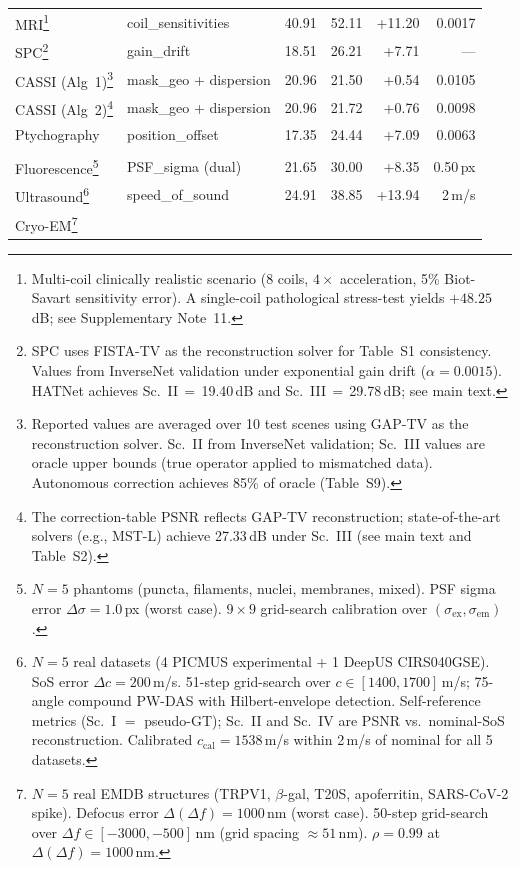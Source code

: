 \documentclass[11pt]{article}
\theoremstyle{definition}
\begin{document}
\begin{longtable}{>{\raggedright}p{2.0cm} >{\raggedright}p{2.8cm}
                  r r r r}
MRI\footnote{Multi-coil clinically realistic scenario (8 coils, $4\times$ acceleration, 5\% Biot-Savart sensitivity error). A single-coil pathological stress-test yields $+48.25$\,dB; see Supplementary Note~11.}
  & coil\_sensitivities
  & 40.91 & 52.11 & +11.20
  & 0.0017 \\
SPC\footnote{SPC uses FISTA-TV as the reconstruction solver for Table~S1 consistency.  Values from InverseNet validation under exponential gain drift ($\alpha{=}0.0015$).  HATNet achieves Sc.~II$\,=\,$19.40\,dB and Sc.~III$\,=\,$29.78\,dB; see main text.}
  & gain\_drift
  & 18.51 & 26.21 & +7.71
  & --- \\
CASSI (Alg~1)\footnote{Reported values are averaged over 10 test scenes using GAP-TV as the reconstruction solver. Sc.~II from InverseNet validation; Sc.~III values are oracle upper bounds (true operator applied to mismatched data). Autonomous correction achieves 85\% of oracle (Table~S9).}
  & mask\_geo + dispersion
  & 20.96 & 21.50 & +0.54
  & 0.0105 \\
CASSI (Alg~2)\footnote{The correction-table PSNR reflects GAP-TV reconstruction; state-of-the-art solvers (e.g., MST-L) achieve 27.33\,dB under Sc.~III (see main text and Table~S2).}
  & mask\_geo + dispersion
  & 20.96 & 21.72 & +0.76
  & 0.0098 \\
Ptychography
  & position\_offset
  & 17.35 & 24.44 & +7.09
  & 0.0063 \\
\midrule
\multicolumn{6}{l}{\emph{Phase 2 validated additions (multi-phantom aggregate $\pm$ 95\% CI)}} \\
\midrule
Fluorescence\footnote{$N{=}5$ phantoms (puncta, filaments, nuclei, membranes, mixed). PSF sigma error $\Delta\sigma{=}1.0$\,px (worst case). $9 \times 9$ grid-search calibration over $(\sigma_{\mathrm{ex}}, \sigma_{\mathrm{em}})$.}
  & PSF\_sigma (dual)
  & 21.65 & 30.00 & +8.35
  & 0.50\,px \\
Ultrasound\footnote{$N{=}5$ real datasets (4 PICMUS experimental + 1 DeepUS CIRS040GSE). SoS error $\Delta c{=}200$\,m/s. 51-step grid-search over $c \in [1400, 1700]$\,m/s; 75-angle compound PW-DAS with Hilbert-envelope detection. Self-reference metrics (Sc.~I $=$ pseudo-GT); Sc.~II and Sc.~IV are PSNR vs.\ nominal-SoS reconstruction. Calibrated $c_{\mathrm{cal}}{=}1538$\,m/s within 2\,m/s of nominal for all 5 datasets.}
  & speed\_of\_sound
  & 24.91 & 38.85 & +13.94
  & 2\,m/s \\
Cryo-EM\footnote{$N{=}5$ real EMDB structures (TRPV1, $\beta$-gal, T20S, apoferritin, SARS-CoV-2 spike). Defocus error $\Delta(\Delta f){=}1000$\,nm (worst case). 50-step grid-search over $\Delta f \in [-3000, -500]$\,nm (grid spacing ${\approx}51$\,nm). $\rho{=}0.99$ at $\Delta(\Delta f){=}1000$\,nm.}

\end{longtable}
\end{document}
